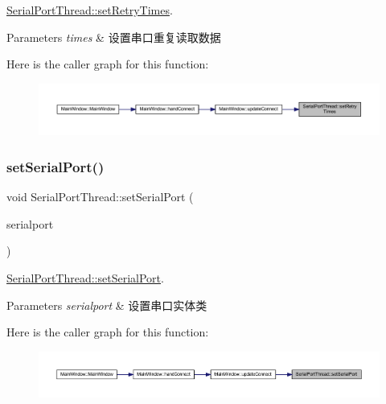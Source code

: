 \mbox{\hyperlink{class_serial_port_thread_a0508026c05c1c2b2c1d2912be2162a9f}{Serial\+Port\+Thread\+::set\+Retry\+Times}}. 


\begin{DoxyParams}{Parameters}
{\em times} & 设置串口重复读取数据 \\
\hline
\end{DoxyParams}
Here is the caller graph for this function\+:
\nopagebreak
\begin{figure}[H]
\begin{center}
\leavevmode
\includegraphics[width=350pt]{class_serial_port_thread_a0508026c05c1c2b2c1d2912be2162a9f_icgraph}
\end{center}
\end{figure}
\mbox{\label{class_serial_port_thread_a7f6a1a41be1727ce2549aa0d8e386340}} 
\subsubsection{\texorpdfstring{setSerialPort()}{setSerialPort()}}
{\footnotesize\ttfamily void Serial\+Port\+Thread\+::set\+Serial\+Port (\begin{DoxyParamCaption}\item[{Q\+Serial\+Port $\ast$}]{serialport }\end{DoxyParamCaption})}



\mbox{\hyperlink{class_serial_port_thread_a7f6a1a41be1727ce2549aa0d8e386340}{Serial\+Port\+Thread\+::set\+Serial\+Port}}. 


\begin{DoxyParams}{Parameters}
{\em serialport} & 设置串口实体类 \\
\hline
\end{DoxyParams}
Here is the caller graph for this function\+:
\nopagebreak
\begin{figure}[H]
\begin{center}
\leavevmode
\includegraphics[width=350pt]{class_serial_port_thread_a7f6a1a41be1727ce2549aa0d8e386340_icgraph}
\end{center}
\end{figure}
\mbox{\label{class_serial_port_thread_ae7403dd74cb71b0e925e933073020cd2}} 

